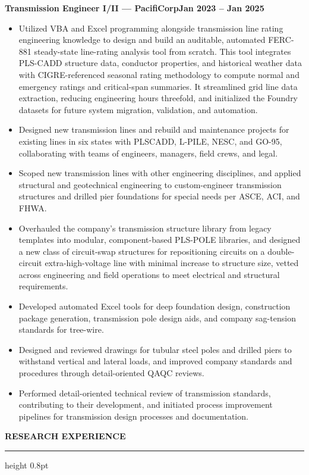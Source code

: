 \documentclass[10pt, letterpaper]{article}
\newcommand{\rsection}[1]{%
  \vspace{8pt}%
  {\large\bfseries\MakeUppercase{#1}}%
  \vspace{1pt}%
  \hrule height 0.8pt%
  \vspace{4pt}%
}
\newcommand{\jobline}[2]{%
  \vspace{5pt}%
  \noindent\textbf{#1}\hfill\textbf{#2}\par%
  \vspace{1pt}%
}
\newenvironment{rlist}{%
  \begin{itemize}[leftmargin=1.4em, itemsep=1pt, topsep=2pt, parsep=0pt]%
}{%
  \end{itemize}%
}
\begin{document}
\jobline{Transmission Engineer I/II --- PacifiCorp}{Jan 2023 -- Jan 2025}
\begin{rlist}
  \item Utilized VBA and Excel programming alongside transmission line rating engineering knowledge to design and build an auditable, automated FERC-881 steady-state line-rating analysis tool from scratch. This tool integrates PLS-CADD structure data, conductor properties, and historical weather data with CIGRE-referenced seasonal rating methodology to compute normal and emergency ratings and critical-span summaries. It streamlined grid line data extraction, reducing engineering hours threefold, and initialized the Foundry datasets for future system migration, validation, and automation.
  \item Designed new transmission lines and rebuild and maintenance projects for existing lines in six states with PLSCADD, L-PILE, NESC, and GO-95, collaborating with teams of engineers, managers, field crews, and legal.
  \item Scoped new transmission lines with other engineering disciplines, and applied structural and geotechnical engineering to custom-engineer transmission structures and drilled pier foundations for special needs per ASCE, ACI, and FHWA.
  \item Overhauled the company's transmission structure library from legacy templates into modular, component-based PLS-POLE libraries, and designed a new class of circuit-swap structures for repositioning circuits on a double-circuit extra-high-voltage line with minimal increase to structure size, vetted across engineering and field operations to meet electrical and structural requirements.
  \item Developed automated Excel tools for deep foundation design, construction package generation, transmission pole design aids, and company sag-tension standards for tree-wire.
  \item Designed and reviewed drawings for tubular steel poles and drilled piers to withstand vertical and lateral loads, and improved company standards and procedures through detail-oriented QAQC reviews.
  \item Performed detail-oriented technical review of transmission standards, contributing to their development, and initiated process improvement pipelines for transmission design processes and documentation.
\end{rlist}

\rsection{Research Experience}
\end{document}
